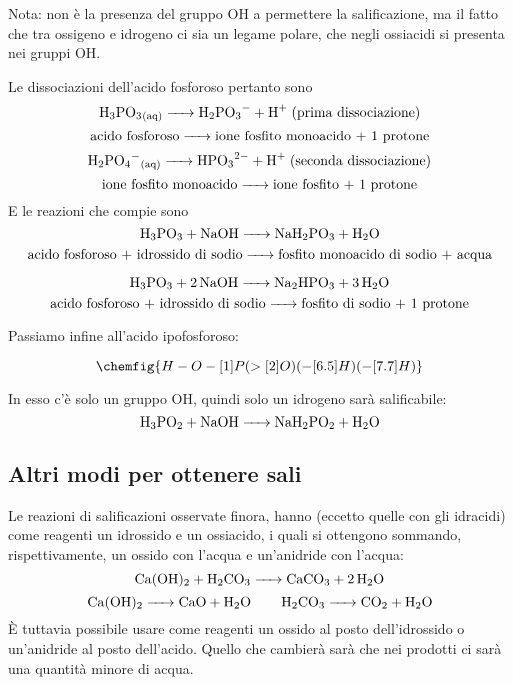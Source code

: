 Nota: non è la presenza del gruppo OH a permettere la salificazione, ma il fatto che tra ossigeno e idrogeno ci sia un legame polare, che negli ossiacidi si presenta nei gruppi OH.

\vspace{0.2cm}Le dissociazioni dell'acido fosforoso pertanto sono
$$\ce{H_3PO_3_{(aq)} -> H_2PO_3- + H+}\; \text{(prima dissociazione)}$$
$$\text{acido fosforoso}\ce{->}\text{ione fosfito monoacido + 1 protone}$$
$$\ce{H_2PO_4^-_{(aq)} -> HPO_3^{2-} + H+}\; \text{(seconda dissociazione)}$$
$$\text{ione fosfito monoacido}\ce{->}\text{ione fosfito + 1 protone}$$
E le reazioni che compie sono
$$\ce{H_3PO_3 + NaOH -> NaH_2PO_3 + H_2O}$$
$$\text{acido fosforoso + idrossido di sodio}\ce{->}\text{fosfito monoacido di sodio + acqua}$$

$$\ce{H_3PO_3 + 2 NaOH -> Na_2HPO_3 + 3 H_2O}$$
$$\text{acido fosforoso + idrossido di sodio}\ce{->}\text{fosfito di sodio + 1 protone}$$

Passiamo infine all'acido ipofosforoso:

$${\chemfig{H-O-[1]P(>[2]O)(-[6.5]H)(-[7.7]H)}}$$

In esso c'è solo un gruppo OH, quindi solo un idrogeno sarà salificabile:
$$\ce{H_3PO_2 + NaOH -> NaH_2PO_2 + H_2O}$$
\subsection{Altri modi per ottenere sali}
Le reazioni di salificazioni osservate finora, hanno (eccetto quelle con gli idracidi) come reagenti un idrossido e un ossiacido, i quali si ottengono sommando, rispettivamente, un ossido con l'acqua e un'anidride con l'acqua:
$$\ce{Ca(OH)_2 + H_2CO_3 -> CaCO_3 + 2 H_2O}$$
$$\ce{Ca(OH)_2 -> CaO + H2O \qquad H_2CO_3 -> CO_2 + H_2O}$$
È tuttavia possibile usare come reagenti un ossido al posto dell'idrossido  o un'anidride al posto dell'acido. Quello che cambierà sarà che nei prodotti ci sarà una quantità minore di acqua.

